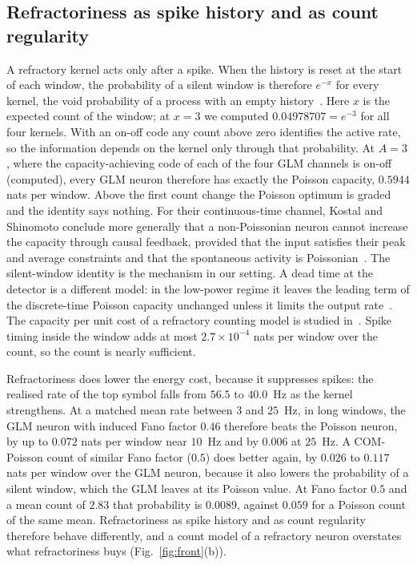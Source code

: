 \documentclass[journal]{IEEEtran}
\begin{document}
\subsection{Refractoriness as spike history and as count regularity}
A refractory kernel acts only after a spike. When the history is reset at the start of each window, the probability of a silent window
is therefore $e^{-x}$ for every kernel, the void probability of a process with an empty history~\cite{DaleyVereJones2003}. Here $x$ is the expected count of the window; at $x = 3$
we computed $0.04978707 = e^{-3}$ for all four kernels. With an on-off code any count above zero identifies the active rate, so the
information depends on the kernel only through that probability. At $A = 3$, where the capacity-achieving code of each of the four GLM
channels is on-off (computed), every GLM neuron therefore has exactly the Poisson capacity, $0.5944$ nats per window. Above the first
count change the Poisson optimum is graded and the identity says nothing. For their continuous-time channel, Kostal and Shinomoto
conclude more generally that a non-Poissonian neuron cannot increase the capacity through causal feedback, provided that the input
satisfies their peak and average constraints and that the spontaneous activity is Poissonian~\cite{KostalShinomoto2016}. The
silent-window identity is the mechanism in our setting. A dead time at the detector is a different model: in the low-power regime it
leaves the leading term of the discrete-time Poisson capacity unchanged unless it limits the output rate~\cite{Wang2020Entropy}. The
capacity per unit cost of a refractory counting model is studied in~\cite{Nasiraee2025}. Spike timing inside the window adds at most $2.7\times 10^{-4}$ nats per window over the count, so the count is
nearly sufficient.

Refractoriness does lower the energy cost, because it suppresses spikes: the realised rate of the top symbol falls from $56.5$ to
$40.0$~Hz as the kernel strengthens. At a matched mean rate between $3$ and $25$~Hz, in long windows, the GLM neuron with induced Fano
factor $0.46$ therefore beats the Poisson neuron, by up to $0.072$ nats per window near $10$~Hz and by $0.006$ at $25$~Hz. A COM-Poisson
count of similar Fano factor ($0.5$) does better again, by $0.026$ to $0.117$ nats per window over the GLM neuron, because it also
lowers the probability of a silent
window, which the GLM leaves at its Poisson value. At Fano factor $0.5$ and a mean count of $2.83$ that probability is $0.0089$, against
$0.059$ for a Poisson count of the same mean. Refractoriness as spike history and as count regularity therefore behave differently, and a count model of a
refractory neuron overstates what refractoriness buys (Fig.~\ref{fig:front}(b)).
\end{document}
